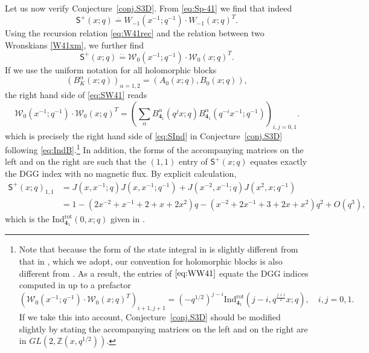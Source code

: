 \documentclass[12pt,reqno]{amsart}
\theoremstyle{definition}
\def\IZ{\mathbb{Z}}
\def\md{\mathbf}
\def\ms{\mathsf}
\def\IZ{\mathbb{Z}}
\def\cW{\mathcal{W}}
\newcommand{\knot}[1]{\md{#1}}
\begin{document}
Let us now verify Conjecture~\ref{conj.S3D}.
From \eqref{eq:Sp-41} we find that indeed
\begin{equation}
  \ms{S}^+(x;q) \stackrel{\cdot}{=} W_{-1}(x^{-1};q^{-1})\cdot W_{-1}(x;q)^T.
\end{equation}
Using the recursion relation \eqref{eq:W41rec} and the relation
between two Wronskians \eqref{W41xm}, we further find 
\begin{equation}
  \ms{S}^+(x;q) \stackrel{\cdot\cdot}{=} \cW_{0}(x^{-1};q^{-1})\cdot
  \cW_{0}(x;q)^T.
  \label{eq:SW41}
\end{equation}
If we use the uniform notation for all holomorphic blocks
\begin{equation}
  (B_{K}^\alpha(x;q))_{\alpha=1,2} = (A_0(x;q),B_0(x;q)),
\end{equation}
the right hand side of \eqref{eq:SW41} reads 
\begin{equation}
  \cW_{0}(x^{-1};q^{-1})\cdot \cW_{0}(x;q)^T =
  \left(
    \sum_{\alpha}B^{\alpha}_{\knot{4}_1}(q^jx;q)
    B^{\alpha}_{\knot{4}_1}(q^{-i}x^{-1};q^{-1})
  \right)_{i,j=0,1}.
  \label{eq:WW41}
\end{equation}
which is precisely the right hand side of \eqref{eq:SInd} in
Conjecture~\ref{conj.S3D} following \eqref{eq:IndB}.\footnote{Note
  that because the form of the state integral in \cite{Beem} is
  slightly different from that in \cite{AK}, which we adopt, our
  convention for holomorphic blocks is also different from
  \cite{Beem}.  As a result, the entries of $\eqref{eq:WW41}$ equate
  the DGG indices computed in \cite{Beem} up to a prefactor
  \begin{equation}
    \left(\cW_{0}(x^{-1};q^{-1})\cdot \cW_{0}(x;q)^T\right)_{i+1,j+1} =
    (-q^{1/2})^{j-i}\text{Ind}_{\knot{4}_1}^{\text{rot}}
    (j-i,q^{\frac{j+i}{2}}x;q),\quad i,j=0,1.
  \end{equation}
  If we take this into account, Conjecture~\ref{conj.S3D} should be
  modified slightly by stating the accompanying matrices on the left
  and on the right are in $GL(2,\IZ(x,q^{1/2}))$.}
In addition, the forms of the accompanying matrices on the left and on the
right are such that the $(1,1)$ entry of $\ms{S}^+(x;q)$ equates
exactly the DGG index with no magnetic flux.
By explicit calculation,
%
\begin{equation}
\label{S11v}
\begin{aligned}
  \ms{S}^+(x;q)_{1,1}& =
  J(x, x^{-1};q) J(x, x^{-1}; q^{-1}) + J(x^{-2}, x^{-1};q) J(x^2, x; q^{-1}) \\
  &=1 -(2x^{-2}+ x^{-1}+2+x + 2x^2)q - (x^{-2}+2x^{-1} +3+ 2x + 
  x^2) q^2 + O(q^3),
  \end{aligned}
\end{equation}
%
which is the $\text{Ind}^{\text{rot}}_{\knot{4}_1}(0,x;q)$ given in
\cite{Beem}.
\end{document}
